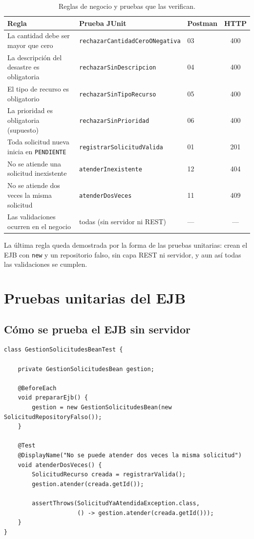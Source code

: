 \documentclass[11pt,letterpaper]{article}
\begin{document}
\begin{table}[H]
\centering\small
\caption{Reglas de negocio y pruebas que las verifican.}
\label{tab:reglas}
\begin{tabularx}{\linewidth}{>{\raggedright\arraybackslash}X l l c}
\toprule
\textbf{Regla} & \textbf{Prueba JUnit} & \textbf{Postman} & \textbf{HTTP} \\
\midrule
La cantidad debe ser mayor que cero & \texttt{rechazarCantidadCeroONegativa} & 03 & 400 \\
La descripción del desastre es obligatoria & \texttt{rechazarSinDescripcion} & 04 & 400 \\
El tipo de recurso es obligatorio & \texttt{rechazarSinTipoRecurso} & 05 & 400 \\
La prioridad es obligatoria (supuesto) & \texttt{rechazarSinPrioridad} & 06 & 400 \\
Toda solicitud nueva inicia en \texttt{PENDIENTE} & \texttt{registrarSolicitudValida} & 01 & 201 \\
No se atiende una solicitud inexistente & \texttt{atenderInexistente} & 12 & 404 \\
No se atiende dos veces la misma solicitud & \texttt{atenderDosVeces} & 11 & 409 \\
Las validaciones ocurren en el negocio & todas (sin servidor ni REST) & --- & --- \\
\bottomrule
\end{tabularx}
\end{table}

La última regla queda demostrada por la forma de las pruebas unitarias: crean el EJB con
\texttt{new} y un repositorio falso, sin capa REST ni servidor, y aun así todas las
validaciones se cumplen.

\section{Pruebas unitarias del EJB}

\subsection{Cómo se prueba el EJB sin servidor}

\begin{lstlisting}[style=java]
class GestionSolicitudesBeanTest {

    private GestionSolicitudesBean gestion;

    @BeforeEach
    void prepararEjb() {
        gestion = new GestionSolicitudesBean(new SolicitudRepositoryFalso());
    }

    @Test
    @DisplayName("No se puede atender dos veces la misma solicitud")
    void atenderDosVeces() {
        SolicitudRecurso creada = registrarValida();
        gestion.atender(creada.getId());

        assertThrows(SolicitudYaAtendidaException.class,
                     () -> gestion.atender(creada.getId()));
    }
}
\end{lstlisting}
\end{document}
